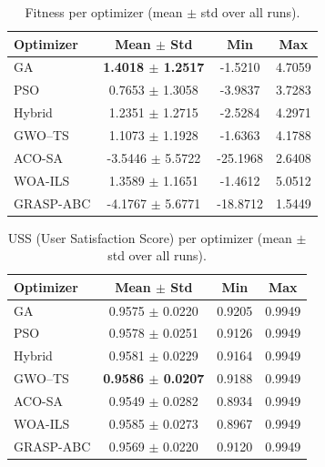 \begin{table}[t]
  \centering
  \caption{Fitness per optimizer (mean $\pm$ std over all runs).}
  \label{tab:fitness_desc}
  \begin{tabular}{@{}l c c c@{}}
    \toprule
    \textbf{Optimizer} & \textbf{Mean $\pm$ Std} & \textbf{Min} & \textbf{Max} \\
    \midrule
    GA & \textbf{1.4018 $\pm$ 1.2517} & -1.5210 & 4.7059 \\
    PSO & 0.7653 $\pm$ 1.3058 & -3.9837 & 3.7283 \\
    Hybrid & 1.2351 $\pm$ 1.2715 & -2.5284 & 4.2971 \\
    GWO--TS & 1.1073 $\pm$ 1.1928 & -1.6363 & 4.1788 \\
    ACO-SA & -3.5446 $\pm$ 5.5722 & -25.1968 & 2.6408 \\
    WOA-ILS & 1.3589 $\pm$ 1.1651 & -1.4612 & 5.0512 \\
    GRASP-ABC & -4.1767 $\pm$ 5.6771 & -18.8712 & 1.5449 \\
    \bottomrule
  \end{tabular}
\end{table}

\begin{table}[t]
  \centering
  \caption{USS (User Satisfaction Score) per optimizer (mean $\pm$ std over all runs).}
  \label{tab:uss_desc}
  \begin{tabular}{@{}l c c c@{}}
    \toprule
    \textbf{Optimizer} & \textbf{Mean $\pm$ Std} & \textbf{Min} & \textbf{Max} \\
    \midrule
    GA & 0.9575 $\pm$ 0.0220 & 0.9205 & 0.9949 \\
    PSO & 0.9578 $\pm$ 0.0251 & 0.9126 & 0.9949 \\
    Hybrid & 0.9581 $\pm$ 0.0229 & 0.9164 & 0.9949 \\
    GWO--TS & \textbf{0.9586 $\pm$ 0.0207} & 0.9188 & 0.9949 \\
    ACO-SA & 0.9549 $\pm$ 0.0282 & 0.8934 & 0.9949 \\
    WOA-ILS & 0.9585 $\pm$ 0.0273 & 0.8967 & 0.9949 \\
    GRASP-ABC & 0.9569 $\pm$ 0.0220 & 0.9120 & 0.9949 \\
    \bottomrule
  \end{tabular}
\end{table}

